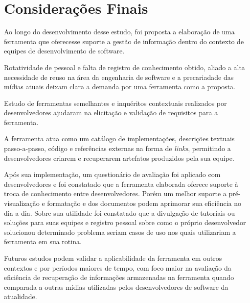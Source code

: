\chapter{Considerações Finais}

Ao longo do desenvolvimento desse estudo, foi proposta a elaboração de uma ferramenta que oferecesse suporte a gestão de informação dentro do contexto de equipes de desenvolvimento de software.

Rotatividade de pessoal e falta de registro de conhecimento obtido, aliado a alta necessidade de reuso na área da engenharia de software e a precariadade das mídias atuais deixam clara a demanda por uma ferramenta como a proposta.

Estudo de ferramentas semelhantes e inquéritos contextuais realizados por desenvolvedores ajudaram na elicitação e validação de requisitos para a ferramenta.

A ferramenta atua como um catálogo de implementações, descrições textuais passo-a-passo, código e referências externas na forma de \textit{links}, permitindo a desenvolvedores criarem e recuperarem artefatos produzidos pela sua equipe.

Após sua implementação, um questionário de avaliação foi aplicado com desenvolvedores e foi constatado que a ferramenta elaborada oferece suporte à troca de conhecimento entre desenvolvedores. Porém um melhor suporte a pré-visualização e formatação e dos documentos podem aprimorar sua eficiência no dia-a-dia. Sobre sua utilidade foi constatado que a divulgação de tutoriais ou soluções para suas equipes e registro pessoal sobre como o próprio desenvolvedor solucionou determinado problema seriam casos de uso nos quais utilizariam a ferramenta em sua rotina.

Futuros estudos podem validar a aplicabilidade da ferramenta em outros contextos e por períodos maiores de tempo, com foco maior na avaliação da eficiência de recuperação de informações armazenadas na ferramenta quando comparada a outras mídias utilizadas pelos desenvolvedores de software da atualidade.
